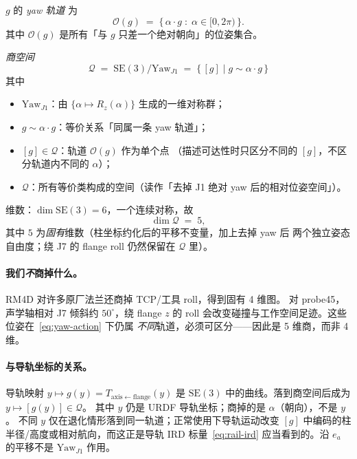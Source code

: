 \documentclass[UTF8,a4paper,11pt,fontset=fandol]{ctexart}
\newcommand{\SE}{\mathrm{SE}}
\begin{document}
\(g\) 的 \emph{yaw 轨道} 为
\begin{equation}
\label{eq:yaw-orbit}
  \mathcal{O}(g)
  \;=\;
  \{\,\alpha\cdot g \;:\; \alpha\in[0,2\pi)\,\}.
\end{equation}
其中 \(\mathcal{O}(g)\) 是所有「与 \(g\) 只差一个绝对朝向」的位姿集合。

\emph{商空间}
\begin{equation}
\label{eq:quotient-def}
  \mathcal{Q}
  \;=\;
  \SE(3)/\mathrm{Yaw}_{J1}
  \;=\;
  \bigl\{\, [g]
  \;\big|\;
  g\sim \alpha\cdot g
  \,\bigr\}
\end{equation}
其中
\begin{itemize}[leftmargin=1.4em]
  \item \(\mathrm{Yaw}_{J1}\)：由 \(\{\alpha\mapsto R_{z}(\alpha)\}\) 生成的一维对称群；
  \item \(g\sim \alpha\cdot g\)：等价关系「同属一条 yaw 轨道」；
  \item \([g]\in\mathcal{Q}\)：轨道 \(\mathcal{O}(g)\) 作为单个点
        （描述可达性时只区分不同的 \([g]\)，不区分轨道内不同的 \(\alpha\)）；
  \item \(\mathcal{Q}\)：所有等价类构成的空间（读作「去掉 J1 绝对 yaw 后的相对位姿空间」）。
\end{itemize}
维数：\(\dim\SE(3)=6\)，一个连续对称，故
\begin{equation}
\label{eq:quotient-dim}
  \dim\mathcal{Q}
  \;=\;
  5,
\end{equation}
其中 \(5\) 为\emph{固有}维数（柱坐标约化后的平移不变量，加上去掉 yaw 后
两个独立姿态自由度；绕 J7 的 flange roll 仍然保留在 \(\mathcal{Q}\) 里）。

\paragraph{我们\emph{不}商掉什么。}
RM4D 对许多原厂法兰还商掉 TCP/工具 roll，得到固有 4 维图。
对 probe45，声学轴相对 J7 倾斜约 \(50^{\circ}\)，绕 flange \(z\) 的 roll
会改变碰撞与工作空间足迹。这些位姿在~\eqref{eq:yaw-action} 下仍属
\emph{不同}轨道，必须可区分——因此是 5 维商，而非 4 维。

\paragraph{与导轨坐标的关系。}
导轨映射 \(y\mapsto g(y)=T_{\mathrm{axis\leftarrow flange}}(y)\) 是
\(\SE(3)\) 中的曲线。落到商空间后成为 \(y\mapsto [g(y)]\in\mathcal{Q}\)。
其中 \(y\) 仍是 URDF 导轨坐标；商掉的是 \(\alpha\)（朝向），不是 \(y\)。
不同 \(y\) 仅在退化情形落到同一轨道；正常使用下导轨运动改变
\([g]\) 中编码的柱半径/高度或相对航向，而这正是导轨 IRD
标量~\eqref{eq:rail-ird} 应当看到的。沿 \(e_{a}\) 的平移不是
\(\mathrm{Yaw}_{J1}\) 作用。
\end{document}

